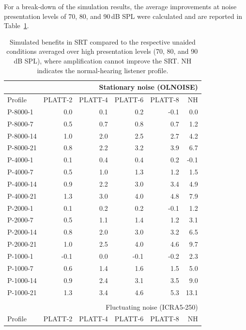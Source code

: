\documentclass[10pt,a4paper,twocolumn]{article}
\begin{document}
For a break-down of the simulation results, the average improvements at noise presentation levels of 70, 80, and 90\,dB SPL were calculated and are reported in Table~\ref{tab:1}.
%
\begin{table}[h]
	\small\sf\centering
	\caption{\label{tab:1}
	 Simulated benefits in SRT compared to the respective unaided conditions averaged over high presentation levels (70, 80, and 90\,dB SPL), where amplification cannot improve the SRT. NH indicates the normal-hearing listener profile.
	}
	\begin{tabular}{l|rrrr|r}
		\multicolumn{6}{r}{Stationary noise (OLNOISE)}\\
		\hline
		\hline
		Profile & \footnotesize \footnotesize PLATT-2 & \footnotesize PLATT-4 & \footnotesize PLATT-6 & \footnotesize PLATT-8 & NH\\
		\hline
		P-8000-1  &  0.0 &  0.1 &  0.2 & -0.1 &  0.0\\
		P-8000-7  &  0.5 &  0.7 &  0.8 &  0.7 &  1.2\\
		P-8000-14 &  1.0 &  2.0 &  2.5 &  2.7 &  4.2\\
		P-8000-21 &  0.8 &  2.2 &  3.2 &  3.9 &  6.7\\
		\hline
		P-4000-1  &  0.1 &  0.4 &  0.4 &  0.2 & -0.1\\
		P-4000-7  &  0.5 &  1.0 &  1.3 &  1.2 &  1.5\\
		P-4000-14 &  0.9 &  2.2 &  3.0 &  3.4 &  4.9\\
		P-4000-21 &  1.3 &  3.0 &  4.0 &  4.8 &  7.9\\
		\hline
		P-2000-1  &  0.1 &  0.2 &  0.2 & -0.1 &  1.2\\
		P-2000-7  &  0.5 &  1.1 &  1.4 &  1.2 &  3.1\\
		P-2000-14 &  0.8 &  2.0 &  3.0 &  3.2 &  6.5\\
		P-2000-21 &  1.0 &  2.5 &  4.0 &  4.6 &  9.7\\
		\hline
		P-1000-1  & -0.1 &  0.0 & -0.1 & -0.2 &  2.3\\
		P-1000-7  &  0.6 &  1.4 &  1.6 &  1.5 &  5.0\\
		P-1000-14 &  0.9 &  2.4 &  3.1 &  3.5 &  9.0\\
		P-1000-21 &  1.3 &  3.4 &  4.6 &  5.3 & 13.1\\
		\hline
		\hline
		\multicolumn{6}{r}{ }\\
		\multicolumn{6}{r}{Fluctuating noise (ICRA5-250)}\\
		\hline
		\hline
		Profile & \footnotesize \footnotesize PLATT-2 & \footnotesize PLATT-4 & \footnotesize PLATT-6 & \footnotesize PLATT-8 & NH\\

\end{tabular}
\end{table}
\end{document}
